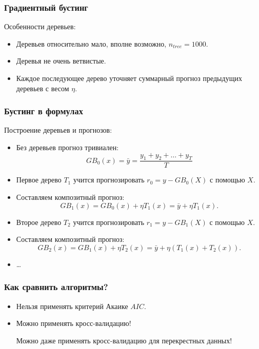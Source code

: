   \begin{frame}
    \frametitle{Градиентный бустинг}

    Особенности деревьев:
    \begin{itemize}[<+->]
      \item Деревьев относительно \alert{мало}, вполне возможно, $n_{tree} = 1000$.
      \item Деревья не очень \alert{ветвистые}.
      \item Каждое последующее дерево \alert{уточняет} суммарный прогноз предыдущих деревьев
      с весом $\eta$.
    \end{itemize}
  \end{frame}


  \begin{frame}
    \frametitle{Бустинг в формулах}
    Построение \alert{деревьев} и прогнозов:
    \begin{itemize}[<+->]
      \item Без деревьев прогноз тривиален: 
      \[
        GB_0(x) = \bar y = \frac{y_1 + y_2 + \ldots + y_T}{T}
      \]
      \item Первое дерево $T_1$ учится прогнозировать $r_0 = y - GB_0(X)$ с помощью $X$.
      \item Составляем композитный прогноз:
      \[
      GB_1(x) = GB_0(x) + \eta T_1(x) =\bar y + \eta T_1(x).  
      \]
  
      \item Второе дерево $T_2$ учится прогнозировать $r_1 = y - GB_1(X)$ с помощью  $X$.
      \item Составляем композитный прогноз:
      \[
      GB_2(x) = GB_1(x) + \eta T_2(x) =\bar y + \eta (T_1(x) + T_2(x)).  
      \]
      \item \ldots
  
    \end{itemize}
  \end{frame}

  
  \begin{frame}
    \frametitle{Как сравнить алгоритмы?}

    \begin{itemize}[<+->]
      \item \alert{Нельзя} применять критерий \alert{Акаике} $AIC$. 
      \item Можно применять \alert{кросс-валидацию}! 
      
      Можно даже применять \alert{кросс-валидацию} для \alert{перекрестных данных}!
    \end{itemize}
    
  
  \end{frame}



